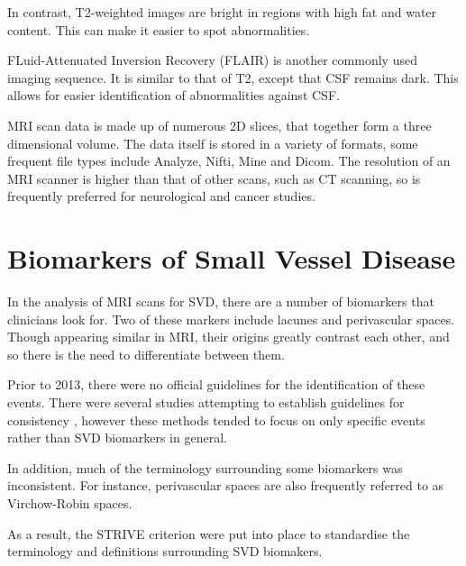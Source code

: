 \documentclass[honours,12pt]{unswthesis}
\numberwithin{equation}{section}
\begin{document}
In contrast, T2-weighted images are bright in regions with high fat and water content. This can make it easier to spot abnormalities.

FLuid-Attenuated Inversion Recovery (FLAIR) is another commonly used imaging sequence. It is similar to that of T2, except that CSF remains dark. This allows for easier identification of abnormalities against CSF.


MRI scan data is made up of numerous 2D slices, that together form a three dimensional volume. The data itself is stored in a variety of formats, some frequent file types include Analyze, Nifti, Mine and Dicom. The resolution of an MRI scanner is higher than that of other scans, such as CT scanning, so is frequently preferred for neurological and cancer studies.

\section{Biomarkers of Small Vessel Disease}\label{svd-markers}

In the analysis of MRI scans for SVD, there are a number of biomarkers that clinicians look for. Two of these markers include lacunes and perivascular spaces. Though appearing similar in MRI, their origins greatly contrast each other, and so there is the need to differentiate between them.

Prior to 2013, there were no official guidelines for the identification of these events. There were several studies attempting to establish guidelines for consistency \cite{PotterGillian2015CPSV, AdamsH.H.Hieab2013RMfD}, however these methods tended to focus on only specific events rather than SVD biomarkers in general.

In addition, much of the terminology surrounding some biomarkers was inconsistent. For instance, perivascular spaces are also frequently referred to as Virchow-Robin spaces\cite{WardlawJ.M.2013Nsfr, AdamsH.H.Hieab2013RMfD}.

As a result, the STRIVE criterion \cite{WardlawJ.M.2013Nsfr} were put into place to standardise the terminology and definitions surrounding SVD biomakers.
\end{document}
